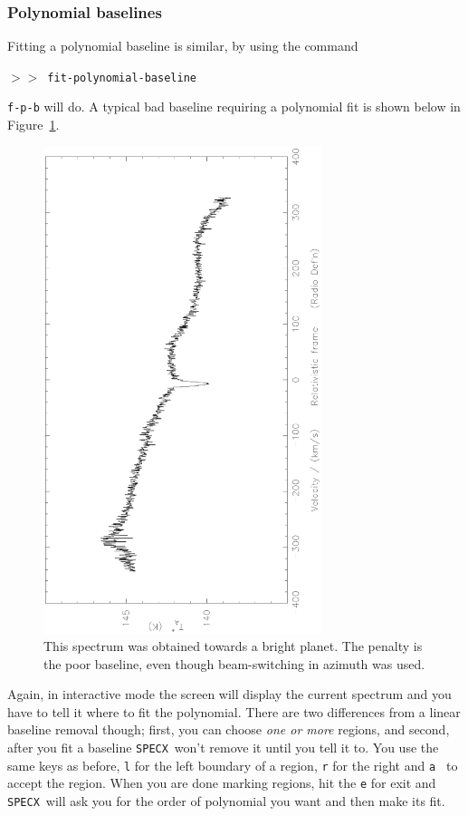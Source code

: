 \documentclass[11pt,twoside]{article}
\newcommand{\SPECX}{{\tt SPECX}}
\newcommand{\SP}{{$>\!>$}}
\begin{document}
\subsubsection{Polynomial baselines}
\label{sec:poly-baselines}
Fitting a polynomial baseline is similar, by using the command

\SP\ \verb|fit-polynomial-baseline|

{\tt f-p-b} will do. A typical bad baseline requiring a polynomial fit
is shown below in Figure~\ref{fig:specx_badbaseline}.

\begin{figure}[htb]
\centering
\includegraphics[angle=-90,width=3.2in]{sc8_badbaseline.ps}
\vspace*{-0.5cm}
\begin{center}
\begin{minipage}[t]{5in}
\caption[Typical bad baseline]
{\small{This spectrum was obtained towards a bright planet. The
penalty is the poor baseline, even though beam-switching in azimuth
was used.  }}
\label{fig:specx_badbaseline}
\end{minipage}
\end{center}
\end{figure}

Again, in interactive mode the screen will display the current
spectrum and you have to tell it where to fit the polynomial.  There
are two differences from a linear baseline removal though; first, you
can choose {\it one or more} regions, and second, after you fit a
baseline \SPECX\
won't remove it until you tell it to.  You use the same keys as
before, {\tt l} for the left boundary of a region, {\tt r} for the
right and {\tt a } to accept the region. When you are done marking
regions, hit the {\tt e} for exit and \SPECX\ will ask you for the
order of polynomial you want and then make its fit.
\end{document}
